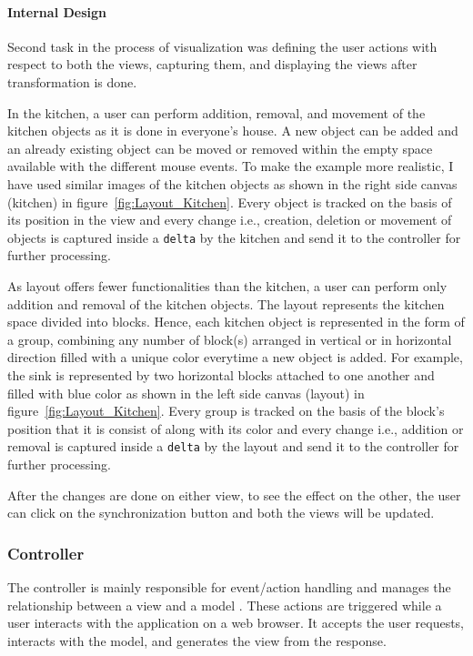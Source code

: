 \paragraph{Internal Design}
Second task in the process of visualization was defining the user actions with respect to both the views, capturing them, and displaying the views after transformation is done.

In the kitchen, a user can perform addition, removal, and movement of the kitchen objects as it is done in everyone's house. A new object can be added and an already existing object can be moved or removed within the empty space available with the different mouse events. To make the example more realistic, I have used similar images of the kitchen objects as shown in the right side canvas (kitchen) in figure~\ref{fig:Layout_Kitchen}. Every object is tracked on the basis of its position in the view and every change i.e., creation, deletion or movement of objects is captured inside a \texttt{delta} by the kitchen and send it to the controller for further processing.

As layout offers fewer functionalities than the kitchen, a user can perform only addition and removal of the kitchen objects. The layout represents the kitchen space divided into blocks. Hence, each kitchen object is represented in the form of a group, combining any number of block(s) arranged in vertical or in horizontal direction filled with a unique color everytime a new object is added. For example, the sink is represented by two horizontal blocks attached to one another and filled with {\color{blue} blue} color as shown in the left side canvas (layout) in figure~\ref{fig:Layout_Kitchen}. Every group is tracked on the basis of the block's position that it is consist of along with its color and every change i.e., addition or removal is captured inside a \texttt{delta} by the layout and send it to the controller for further processing.

After the changes are done on either view, to see the effect on the other, the user can click on the synchronization button and both the views will be updated.
 
\subsubsection{Controller}\label{subsubsec:design_controller}
The controller is mainly responsible for event/action handling and manages the relationship between a view and a model \cite{mdd-webwithmvc}. These actions are triggered while a user interacts with the application on a web browser. It accepts the user requests, interacts with the model, and generates the view from the response.


